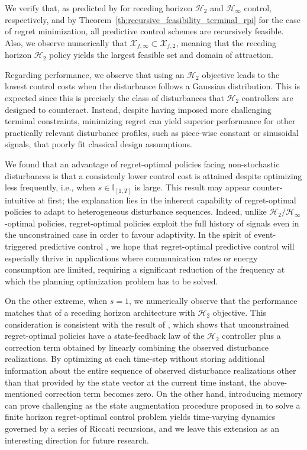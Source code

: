 \documentclass[conference]{IEEEtran}
\begin{document}
We verify that, as predicted by \cite[Th. 4.20, Prop. 5.14]{goulart2007affine} for receding horizon $\mathcal{H}_2$ and $\mathcal{H}_\infty$ control, respectively, and by Theorem~\ref{th:recursive_feasibility_terminal_rpi} for the case of regret minimization, all predictive control schemes are recursively feasible. Also, we observe numerically that $\mathcal{X}_{f,\infty} \subset \mathcal{X}_{f,2}$, meaning that the receding horizon $\mathcal{H}_2$ policy yields the largest feasible set and domain of attraction.

Regarding performance, we observe that using an $\mathcal{H}_2$ objective leads to the lowest control costs when the disturbance follows a Gaussian distribution. This is expected since this is precisely the class of disturbances that $\mathcal{H}_2$ controllers are designed to counteract. Instead, despite having imposed more challenging terminal constraints, minimizing regret can yield superior performance for other practically relevant disturbance profiles, such as piece-wise constant or sinusoidal signals, that poorly fit classical design assumptions.

We found that an advantage of regret-optimal policies facing non-stochastic disturbances is that a consistenly lower control cost is attained despite optimizing less frequently, i.e., when $s \in \mathbb{I}_{[1, T]}$ is large. This result may appear counter-intuitive at first; the explanation lies in the inherent capability of regret-optimal policies to adapt to heterogeneous disturbance sequences. Indeed, unlike $\mathcal{H}_2/\mathcal{H}_\infty$-optimal policies, regret-optimal policies exploit the full history of signals even in the unconstrained case in order to favour adaptivity. In the spirit of event-triggered predictive control \cite{lehmann2013event}, we hope that regret-optimal predictive control will especially thrive in applications where communication rates or energy consumption are limited, requiring a significant reduction of the frequency at which the planning optimization problem has to be solved.

On the other extreme, when $s = 1$, we numerically observe that the performance matches that of a receding horizon architecture with $\mathcal{H}_2$ objective. This consideration is consistent with the result of \cite[Th. 4]{sabag2021regret}, which shows that unconstrained regret-optimal policies have a state-feedback law of the $\mathcal{H}_2$ controller plus a correction term obtained by linearly combining the observed disturbance realizations. By optimizing at each time-step without storing additional information about the entire sequence of observed disturbance realizations other than that provided by the state vector at the current time instant, the above-mentioned correction term becomes zero. On the other hand, introducing memory can prove challenging as the state augmentation procedure proposed in \cite{goel2023regret} to solve a finite horizon regret-optimal control problem yields time-varying dynamics governed by a series of Riccati recursions, and we leave this extension as an interesting direction for future research.
\end{document}
